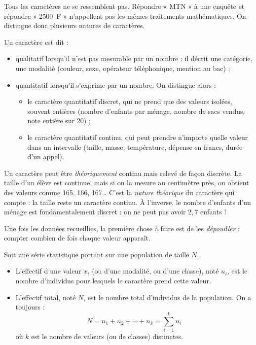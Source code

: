 \documentclass[11pt]{article}
\newcommand{\cle}[1]{{\popxbold\color{popdark}#1}}
\newcounter{popsec}
\newcounter{popsub}
\newcommand{\courssub}[1]{%
  \stepcounter{popsub}%
  \par\vspace{9pt}\noindent{\popxbold\fontsize{11.5}{13}\selectfont\color{popink}{\color{poporange}\thepopsec.\thepopsub}\hspace{6pt}#1}\par\nopagebreak\vspace{4pt}
}
\begin{document}
Tous les caractères ne se ressemblent pas. Répondre « MTN » à une enquête et répondre « \SI{2500}{F} » n'appellent pas les mêmes traitements mathématiques. On distingue donc plusieurs natures de caractères.

\begin{definition}
Un caractère est dit :
\begin{itemize}
\item \cle{qualitatif} lorsqu'il n'est pas mesurable par un nombre : il décrit une catégorie, une modalité (couleur, sexe, opérateur téléphonique, mention au bac) ;
\item \cle{quantitatif} lorsqu'il s'exprime par un nombre. On distingue alors :
\begin{itemize}
\item le caractère \cle{quantitatif discret}, qui ne prend que des valeurs isolées, souvent entières (nombre d'enfants par ménage, nombre de sacs vendus, note entière sur 20) ;
\item le caractère \cle{quantitatif continu}, qui peut prendre n'importe quelle valeur dans un intervalle (taille, masse, température, dépense en francs, durée d'un appel).
\end{itemize}
\end{itemize}
\end{definition}

\begin{attention}
Un caractère peut être \emph{théoriquement} continu mais relevé de façon discrète. La taille d'un élève est continue, mais si on la mesure au centimètre près, on obtient des valeurs comme 165, 166, 167\ldots{} C'est la \emph{nature théorique} du caractère qui compte : la taille reste un caractère continu. À l'inverse, le nombre d'enfants d'un ménage est fondamentalement discret : on ne peut pas avoir $2{,}7$ enfants !
\end{attention}

\courssub{Effectifs et fréquences}

Une fois les données recueillies, la première chose à faire est de les \emph{dépouiller} : compter combien de fois chaque valeur apparaît.

\begin{definition}
Soit une série statistique portant sur une population de taille $N$.
\begin{itemize}
\item L'\cle{effectif} d'une valeur $x_i$ (ou d'une modalité, ou d'une classe), noté $n_i$, est le nombre d'individus pour lesquels le caractère prend cette valeur.
\item L'\cle{effectif total}, noté $N$, est le nombre total d'individus de la population. On a toujours :
\[ N = n_1 + n_2 + \cdots + n_k = \sum_{i=1}^{k} n_i \]
où $k$ est le nombre de valeurs (ou de classes) distinctes.
\end{itemize}
\end{definition}
\end{document}
